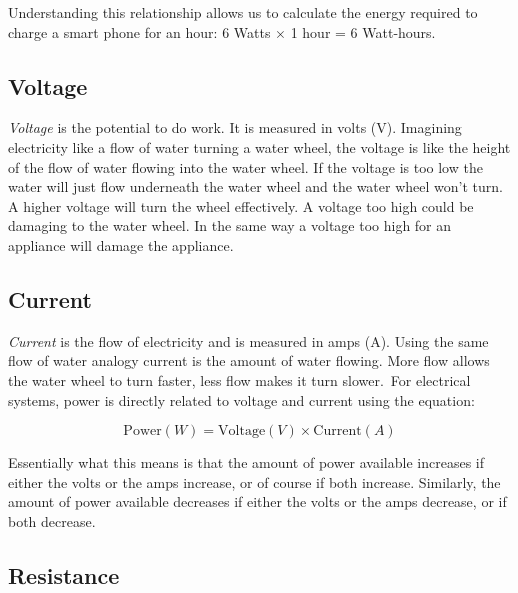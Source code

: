 \documentclass{article}
\theoremstyle{definition}
\theoremstyle{definition}
\theoremstyle{remark}
\begin{document}
    Understanding this relationship allows us to calculate the energy required to charge a smart phone for an hour: 6 Watts \(\times\) 1 hour = 6 Watt-hours.
  

  \subsection{Voltage} %
  \label{sub:voltage}

    \textit{Voltage} is the potential to do work. It is measured in volts (V). Imagining electricity like a flow of water turning a water wheel, the voltage is like the height of the flow of water flowing into the water wheel. If the voltage is too low the water will just flow underneath the water wheel and the water wheel won't turn. A higher voltage will turn the wheel effectively. A voltage too high could be damaging to the water wheel. In the same way a voltage too high for an appliance will damage the appliance.
  

  \subsection{Current} %
  \label{sub:current}

    \textit{Current} is the flow of electricity and is measured in amps (A). Using the same flow of water analogy current is the amount of water flowing. More flow allows the water wheel to turn faster, less flow makes it turn slower. For electrical systems, power is directly related to voltage and current using the equation:

    \begin{equation}
      \text{Power} (W) = \text{Voltage} (V) \times \text{Current} (A)
    \end{equation}

    Essentially what this means is that the amount of power available increases if either the volts or the amps increase, or of course if both increase. Similarly, the amount of power available decreases if either the volts or the amps decrease, or if both decrease.
  

  \subsection{Resistance} %
  \label{sub:resistance}
\end{document}
